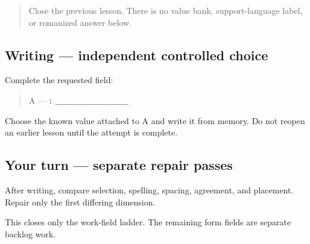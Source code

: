 \begin{quote}
Close the previous lesson. There is no value bank, support-language label, or romanized answer below.
\end{quote}

\subsection*{Writing — independent controlled choice}
Complete the requested field:

\begin{quote}
A — \textbf{: \_\_\_\_\_\_\_\_\_\_}
\end{quote}

Choose the known value attached to A and write it from memory. Do not reopen an earlier lesson until the attempt is complete.

\subsection*{Your turn — separate repair passes}
After writing, compare selection, spelling, spacing, agreement, and placement. Repair only the first differing dimension.

\begin{tcolorbox}[breakable,colback=teal!4,colframe=teal!35!black,title={Before you move on}]
This closes only the work-field ladder. The remaining form fields are separate backlog work.
\end{tcolorbox}

